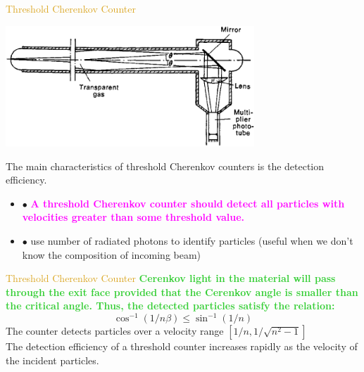 \documentclass[11pt]{beamer} %
\renewcommand{\(}{\begin{columns}}
\renewcommand{\)}{\end{columns}}
\newcommand{\<}[1]{\begin{column}{#1}}
\renewcommand{\>}{\end{column}}
\newcommand{\itt}{\begin{itemize}}
\newcommand{\tti}{\end{itemize}}
\newcommand{\hlt}[2]{\textcolor{#1}{\textbf{#2}}}
\begin{document}
\begin{frame}{\textcolor{Goldenrod}{Threshold Cherenkov Counter}}
  \begin{center}
    \includegraphics[width=0.7\textwidth, height=0.3\textheight]{./Images/threshold_gas_Cherenkov_detector}
  \end{center}
  The main characteristics of threshold Cherenkov counters
  is the detection efficiency. 

\itt
\item[$\bullet$] \hlt{Magenta}{A threshold Cherenkov counter should
    detect all particles with velocities greater than some threshold
    value.}
\item[$\bullet$] use number of radiated photons to identify particles
  (useful when we don't know the composition of incoming beam)
  \tti
\end{frame}

\begin{frame}{\textcolor{Goldenrod}{Threshold Cherenkov Counter}}
  \hlt{LimeGreen}{Cerenkov light in the material will pass through the exit face
  provided that the Cerenkov angle is smaller than the critical angle.
  Thus, the detected particles satisfy the relation:}
  \[
    \cos^{-1}(1/n\beta) \leq \sin^{-1}(1/n)
  \]
  The counter detects particles over a velocity range $ [1/n,
  1/\sqrt{n^2 -1}]$\\
  The detection efficiency of a threshold counter increases rapidly as the
  velocity of the incident particles.
\end{frame}
\end{document}
